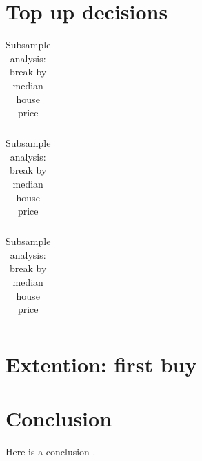 \documentclass[12pt]{article}
\begin{document}
\section{Top up decisions}

	





	

\begin{table}
	\centering
	\footnotesize
	\caption{Subsample analysis: break by median house price}
	\begin{tabular}{ll}
		
	\end{tabular}
\end{table}


\begin{table}
	\centering
	\footnotesize
	\caption{Subsample analysis: break by median house price}
	\begin{tabular}{ll}
		
	\end{tabular}
\end{table}


\begin{table}
	\centering
	\footnotesize
	\caption{Subsample analysis: break by median house price}
	\begin{tabular}{ll}
		
	\end{tabular}
\end{table}


\newpage

\section{Extention: first buy}







\newpage

\section{Conclusion}
Here is a conclusion \citep{hartzmark2015worst}.

\printbibliography
\end{document}
